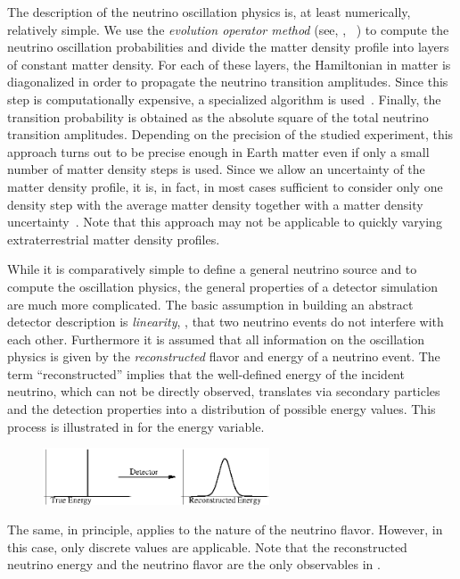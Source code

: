 The description of the neutrino oscillation physics is, at least numerically, relatively simple. We use the {\em evolution operator method} (see, \eg, \Ref~\cite{Ohlsson:1999um})  to compute the neutrino oscillation probabilities and divide the matter density profile into layers of constant matter density. For each of these layers, the Hamiltonian in matter is diagonalized in order to propagate the neutrino transition amplitudes. Since this step is computationally expensive, a specialized algorithm is used~\cite{Kopp:2006wp}. Finally, the transition probability is obtained as the absolute square of the total neutrino transition amplitudes. Depending on the precision of the studied experiment, this approach turns out to be precise enough in Earth matter even if only a small number of matter density steps is used. Since we allow an uncertainty of the matter density profile, it is, in fact, in most cases sufficient to consider only one density step with the average matter density together with a matter density uncertainty~\cite{Ohlsson:2003ip}. Note that this approach may not be applicable to quickly varying extraterrestrial matter density profiles.

While it is comparatively simple to define a general neutrino source 
and to compute the oscillation physics, the general properties of a detector simulation are much more complicated. The basic assumption in building an abstract detector description is \emph{linearity}, \ie , that two neutrino events do not interfere with each other. Furthermore it is assumed that all information on the oscillation physics 
is given by the \emph{reconstructed} flavor and energy of a 
neutrino event. The term ``reconstructed'' implies that the well-defined energy of the incident neutrino, which can not be directly observed, translates via secondary particles and the detection properties into a distribution of possible energy values. This process is illustrated in  for the energy variable. 
%
\begin{figure}[ht]
\begin{center}
\includegraphics[width=0.6\textwidth]{mapping}
\end{center}
\end{figure}
% 
The same, in principle, applies to the nature of the neutrino flavor. However, in this case, only discrete values are applicable. Note that the reconstructed neutrino energy and the neutrino flavor are the only observables in \GLOBES .

